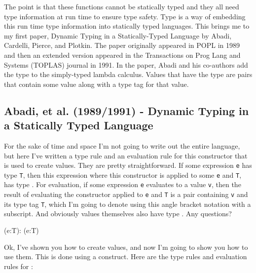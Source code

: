 \documentclass[12pt]{article}	%
\begin{document}
The point is that these functions cannot be statically typed and they all need type information at run time to ensure type safety. Type \Dynamic is a way of embedding this run time type information into statically typed languages. This brings me to my first paper, Dynamic Typing in a Statically-Typed Language by Abadi, Cardelli, Pierce, and Plotkin. The paper originally appeared in POPL in 1989 and then an extended version appeared in the Transactions on Prog Lang and Systems (TOPLAS) journal in 1991. In the paper, Abadi and his co-authors add the type \Dynamic to the simply-typed lambda calculus. Values that have the type \Dynamic are pairs that contain some value along with a type tag for that value. 

\subsection*{Abadi, et al. (1989/1991) - Dynamic Typing in a Statically Typed Language}


For the sake of time and space I'm not going to write out the entire language, but here I've written a type rule and an evaluation rule for this \dynamic constructor that is used to create \Dynamic values. They are pretty straightforward. If some expression \texttt{e} has type \texttt{T}, then this expression where this \dynamic constructor is applied to some \texttt{e} and \texttt{T}, has type \Dynamic. For evaluation, if some expression \texttt{e} evaluates to a value \texttt{v}, then the result of evaluating the \dynamic constructor applied to \texttt{e} and \texttt{T} is a pair containing \texttt{v} and its type tag \texttt{T}, which I'm going to denote using this angle bracket notation with a subscript. And obviously \Dynamic values themselves also have type \Dynamic. Any questions?


          { \Gamma\vdash (\dynamic\;e:T):\Dynamic }
          { (\dynamic\;e:T) \eval {} }

$\;$\\


Ok, I've shown you how to create \Dynamic values, and now I'm going to show you how to use them. This is done using a \typecase construct. Here are the type rules and evaluation rules for \typecase:
\end{document}
